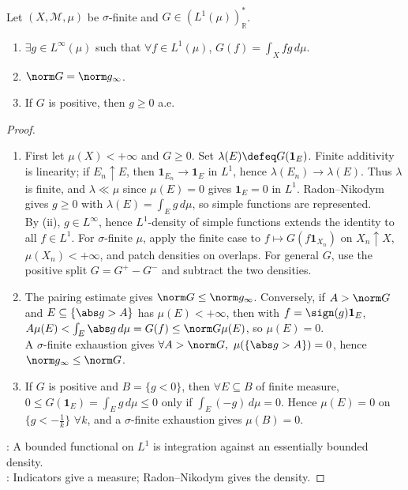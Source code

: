\begin{theorem} \label{thm:riesz-representation-l1} \\
Let $(X,\mathcal M,\mu)$ be $\sigma$-finite and $G\in(L^1(\mu))^*_\mathbb R$.
\begin{enumerate}[label=(\roman*)]
\setlength{\itemsep}{0pt}
\item $\exists g\in L^\infty(\mu)$ such that $\forall f\in L^1(\mu)$, $G(f)=\int_Xfg\,d\mu$.
\item $\norm G=\norm g_\infty$.
\item If $G$ is positive, then $g\geq0$ a.e.
\end{enumerate}
\begin{proof}
\begin{enumerate}[label=(\roman*)]
\setlength{\itemsep}{0pt}
\item First let $\mu(X)<+\infty$ and $G\geq0$. Set $\lambda(E)\defeq G(\mathbf 1_E)$. Finite additivity is linearity; if $E_n\uparrow E$, then $\mathbf 1_{E_n}\to\mathbf 1_E$ in $L^1$, hence $\lambda(E_n)\to\lambda(E)$. Thus $\lambda$ is finite, and $\lambda\ll\mu$ since $\mu(E)=0$ gives $\mathbf 1_E=0$ in $L^1$. Radon--Nikodym gives $g\geq0$ with $\lambda(E)=\int_Eg\,d\mu$, so simple functions are represented.\\
By (ii), $g\in L^\infty$, hence $L^1$-density of simple functions extends the identity to all $f\in L^1$. For $\sigma$-finite $\mu$, apply the finite case to $f\mapsto G(f\mathbf 1_{X_n})$ on $X_n\uparrow X$, $\mu(X_n)<+\infty$, and patch densities on overlaps. For general $G$, use the positive split $G=G^+-G^-$ and subtract the two densities.
\item The pairing estimate gives $\norm G\leq\norm g_\infty$. Conversely, if $A>\norm G$ and $E\subseteq\{\abs g>A\}$ has $\mu(E)<+\infty$, then with $f=\sign(g)\mathbf 1_E$, $A\mu(E)<\int_E\abs g\,d\mu=G(f)\leq\norm G\mu(E)$, so $\mu(E)=0$.\\
A $\sigma$-finite exhaustion gives $\forall A>\norm G,\ \mu(\{\abs g>A\})=0$, hence $\norm g_\infty\leq\norm G$.
\item If $G$ is positive and $B=\{g<0\}$, then $\forall E\subseteq B$ of finite measure, $0\leq G(\mathbf 1_E)=\int_Eg\,d\mu\leq0$ only if $\int_E(-g)\,d\mu=0$. Hence $\mu(E)=0$ on $\{g<-\frac{1}{k}\}$ $\forall k$, and a $\sigma$-finite exhaustion gives $\mu(B)=0$.
\end{enumerate}
: A bounded functional on $L^1$ is integration against an essentially bounded density.\\
: Indicators give a measure; Radon--Nikodym gives the density.
\end{proof}
\end{theorem}

